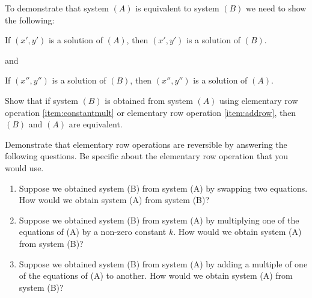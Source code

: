 \documentclass{ximera}
\begin{document}
\begin{problem}
To demonstrate that system $(A)$ is equivalent to system $(B)$ we need to show the following:
\begin{center}
If $(x', y')$ is a solution of $(A)$, then $(x', y')$ is a solution of $(B)$.

and

If $(x'', y'')$ is a solution of $(B)$, then $(x'', y'')$ is a solution of $(A)$.
\end{center}

Show that  if system $(B)$ is obtained from system $(A)$ using elementary row operation \ref{item:constantmult} or elementary row operation \ref{item:addrow}, then $(B)$ and $(A)$ are equivalent.
\end{problem}
 \begin{problem}\label{prob:elemrowopsreverse}
 Demonstrate that elementary row operations are reversible by answering the following questions.  Be specific about the elementary row operation that you would use.
\begin{enumerate}
 \item Suppose we obtained system (B) from system (A) by swapping two equations. How would we obtain system (A) from system (B)?
 \item Suppose we obtained system (B) from system (A) by multiplying one of the equations of (A) by a non-zero constant $k$.  How would we obtain system (A) from system (B)?
 \item Suppose we obtained system (B) from system (A) by adding a multiple of one of the equations of (A) to  another.  How would we obtain system (A) from system (B)?
 \end{enumerate}
 \end{problem}
\end{document}
